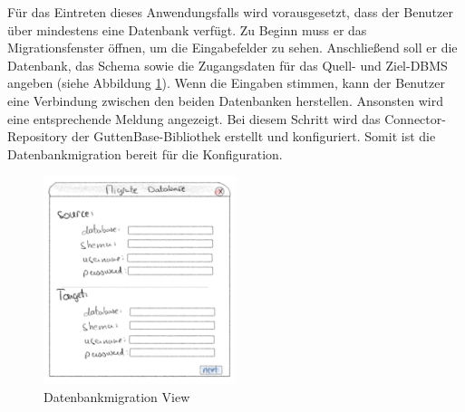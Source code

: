 Für das Eintreten dieses Anwendungsfalls wird vorausgesetzt, dass der Benutzer über mindestens eine Datenbank verfügt. Zu Beginn muss er das Migrationsfenster öffnen, um die Eingabefelder zu sehen. Anschließend soll er die Datenbank, das Schema sowie die Zugangsdaten für das Quell- und Ziel-DBMS angeben (siehe Abbildung \ref{img:generalview}). 
Wenn die Eingaben stimmen, kann der Benutzer eine Verbindung zwischen den beiden Datenbanken herstellen. Ansonsten wird eine entsprechende Meldung angezeigt. Bei diesem Schritt wird das Connector-Repository der GuttenBase-Bibliothek erstellt und konfiguriert. Somit ist die Datenbankmigration bereit für die Konfiguration.
\begin{figure}[H]
	\centering
	\includegraphics[width=0.5\textwidth]{images/generalview}
	\caption{Datenbankmigration View}
	\label{img:generalview}
\end{figure}
